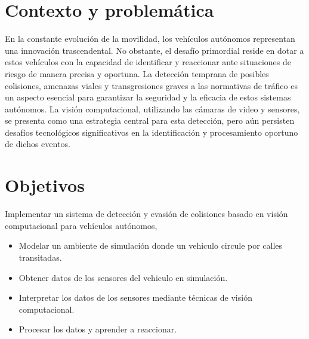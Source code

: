 \documentclass[10pt,letterpaper,final]{article}
\begin{document}
    \section*{Contexto y problemática}
    \noindent En la constante evolución de la movilidad, los vehículos autónomos representan una innovación trascendental.
    No obstante, el desafío primordial reside en dotar a estos vehículos con la capacidad de identificar y reaccionar ante situaciones de riesgo
    de manera precisa y oportuna. La detección temprana de posibles colisiones, amenazas viales y transgresiones graves a las normativas de tráfico
    es un aspecto esencial para garantizar la seguridad y la eficacia de estos sistemas autónomos. La visión computacional,
    utilizando las cámaras de video y sensores, se presenta como una estrategia central para esta detección,
    pero aún persisten desafíos tecnológicos significativos en la identificación y procesamiento oportuno de dichos eventos.
    \section*{Objetivos}
    \newline
    \noindent Implementar un sistema de detección y evasión de colisiones basado en visión computacional para vehículos autónomos,
    \newline
    \newline
    \begin{itemize}
        \item Modelar un ambiente de simulación donde un vehiculo circule por calles transitadas.
        \item Obtener datos de los sensores del vehiculo en simulación.
        \item Interpretar los datos de los sensores mediante técnicas de visión computacional.
        \item Procesar los datos y aprender a reaccionar.
    \end{itemize}
    \clearpage
\end{document}
